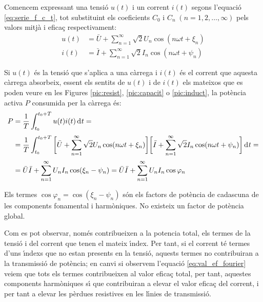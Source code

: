 Comencem expressant una tensi\'{o} $u(t)$ i un corrent $i(t)$
 segons l'equaci\'{o} \eqref{eq:serie_f_c_t}, tot substituint els
 coeficients $C_0$ i $C_n \;(n=1,2,\ldots,\infty)$ pels valors mitj\`{a} i efica\c{c}
 respectivament:
 \begin{align}
    u(t)  &= \bar{U} + \sum_{n=1}^\infty \sqrt{2} U_n \cos (n \omega t +
    \xi_n)\\[0.5ex]
    i(t)  &= \bar{I} + \sum_{n=1}^\infty \sqrt{2} I_n \cos (n \omega t + \psi_n)
 \end{align}

Si  $u(t)$ \'{e}s la tensi\'{o} que s'aplica a una c\`{a}rrega i $i(t)$ \'{e}s el
corrent que aquesta c\`{a}rrega absorbeix, essent els sentits de $u(t)$
i de $i(t)$ els mateixos que es poden veure en les Figures
\ref{pic:resist}, \ref{pic:capacit} o \ref{pic:induct}, la pot\`{e}ncia
activa $P$ consumida per la c\`{a}rrega \'{e}s:
\begin{equation}\begin{split}
    P &= \frac{1}{T} \int_{t_0}^{t_0+T} u(t) i(t) \diff t =
    \\[0.5ex]
     &= \frac{1}{T} \int_{t_0}^{t_0+T} \bigg[\bar{U} + \sum_{n=1}^\infty
    \sqrt{2} U_n \cos (n \omega t + \xi_n) \bigg]
    \bigg[\bar{I} + \sum_{n=1}^\infty \sqrt{2} I_n
    \cos (n \omega t + \psi_n)\bigg] \diff t=\\[0.5ex]
    &=\bar{U} \bar{I} + \sum_{n=1}^\infty U_n I_n
    \cos(\xi_n-\psi_n) = \bar{U} \bar{I} + \sum_{n=1}^\infty U_n I_n
    \cos \varphi_n \label{eq:pot_fu}
\end{split}\end{equation}

Els termes $\cos \varphi_n=\cos (\xi_n-\psi_n)$ s\'{o}n els factors de
pot\`{e}ncia de cadascuna de les components fonamental i harm\`{o}niques. No
existeix un factor de pot\`{e}ncia global.

 Com es pot observar, nom\'{e}s contribueixen a la potencia
total, els termes de la tensi\'{o} i del corrent que tenen el mateix
\'{\i}ndex. Per tant, si el corrent t\'{e} termes d'uns \'{\i}ndexs que no estan
presents en la tensi\'{o}, aquests termes no contribuiran a la
transmissi\'{o} de  pot\`{e}ncia; en canvi si observem l'equaci\'{o}
\eqref{eq:val_ef_fourier} veiem que tots els termes contribueixen al
valor efica\c{c} total, per tant, aquestes components harm\`{o}niques s\'{\i} que
contribuiran a elevar el valor efica\c{c} del corrent, i per tant a
elevar les p\`{e}rdues resistives en les l\'{\i}nies de transmissi\'{o}.

